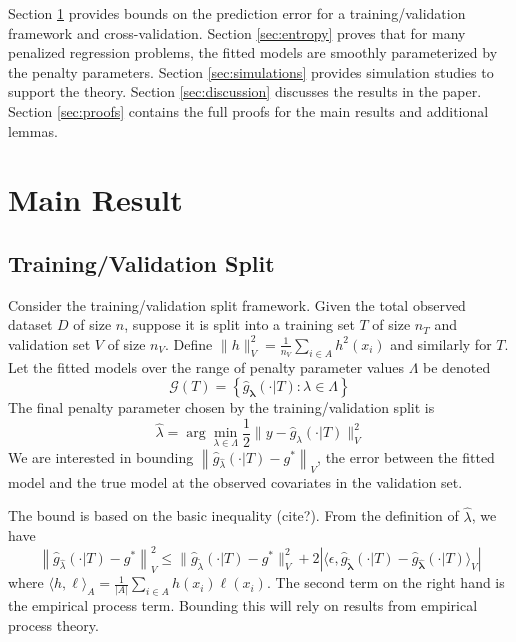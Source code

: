 \documentclass[12pt]{article}
\begin{document}
Section \ref{sec:main_results} provides bounds on the prediction error for a training/validation framework and cross-validation.
Section \ref{sec:entropy} proves that for many penalized regression problems, the fitted models are smoothly parameterized by the penalty parameters.
Section \ref{sec:simulations} provides simulation studies to support the theory.
Section \ref{sec:discussion} discusses the results in the paper.
Section \ref{sec:proofs} contains the full proofs for the main results and additional lemmas.

\section{Main Result} \label{sec:main_results}

\subsection{Training/Validation Split}

Consider the training/validation split framework. Given the total observed dataset $D$ of size $n$, suppose it is split into a training set $T$ of size $n_T$ and validation set $V$ of size $n_V$. Define $\| h \|_V^2 = \frac{1}{n_V}\sum_{i\in A} h^2(x_i)$ and similarly for $T$. Let the fitted models over the range of penalty parameter values $\Lambda$ be denoted
\begin{equation}
\label{function_class_GT}
\mathcal{G}(T) = \left \{ \hat{g}_{\boldsymbol \lambda}(\cdot | T) : \lambda \in \Lambda  \right \}
\end{equation}
The final penalty parameter chosen by the training/validation split is
\begin{equation}
\label{cv_lambda}
\hat{\lambda} = \arg\min_{\lambda\in\Lambda} \frac{1}{2}  \| y-\hat{g}_{\lambda}(\cdot | T) \|_{V}^{2}
\end{equation} 
We are interested in bounding $\left \|\hat{g}_{\hat{\lambda} }(\cdot | T) - g^* \right \|_V$, the error between the fitted model and the true model at the observed covariates in the validation set. 

The bound is based on the basic inequality (cite?). From the definition of $\hat{\lambda}$, we have
\begin{equation}
\label{basic_ineq}
\left \|\hat{g}_{\hat{\lambda} }(\cdot | T) - g^* \right \|_V^2
\le
\| \hat{g}_{\tilde{\lambda}}(\cdot | T) - g^*\|_V^2 + 
2 \left | \langle \epsilon, \hat{g}_{\tilde{\boldsymbol \lambda}}(\cdot | T) - \hat{g}_{\hat{\boldsymbol \lambda}}(\cdot | T) \rangle_V \right |
\end{equation}
where $\langle h, \ell \rangle_A = \frac{1}{|A|}\sum_{i\in A} h(x_i) \ell(x_i)$. The second term on the right hand is the empirical process term. Bounding this will rely on results from empirical process theory.
\end{document}
